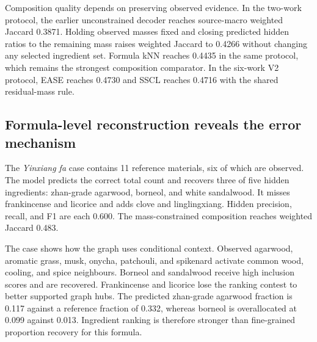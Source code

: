 \documentclass[11pt,a4paper]{article}
\newcommand{\SSCL}{\textsc{SSCL}}
\begin{document}
Composition quality depends on preserving observed evidence. In the two-work protocol, the earlier unconstrained decoder reaches source-macro weighted Jaccard 0.3871. Holding observed masses fixed and closing predicted hidden ratios to the remaining mass raises weighted Jaccard to 0.4266 without changing any selected ingredient set. Formula kNN reaches 0.4435 in the same protocol, which remains the strongest composition comparator. In the six-work V2 protocol, EASE reaches 0.4730 and \SSCL{} reaches 0.4716 with the shared residual-mass rule.

\subsection{Formula-level reconstruction reveals the error mechanism}

The \emph{Yinxiang fa} case contains 11 reference materials, six of which are observed. The model predicts the correct total count and recovers three of five hidden ingredients: zhan-grade agarwood, borneol, and white sandalwood. It misses frankincense and licorice and adds clove and linglingxiang. Hidden precision, recall, and F1 are each 0.600. The mass-constrained composition reaches weighted Jaccard 0.483.

The case shows how the graph uses conditional context. Observed agarwood, aromatic grass, musk, onycha, patchouli, and spikenard activate common wood, cooling, and spice neighbours. Borneol and sandalwood receive high inclusion scores and are recovered. Frankincense and licorice lose the ranking contest to better supported graph hubs. The predicted zhan-grade agarwood fraction is 0.117 against a reference fraction of 0.332, whereas borneol is overallocated at 0.099 against 0.013. Ingredient ranking is therefore stronger than fine-grained proportion recovery for this formula.
\end{document}
